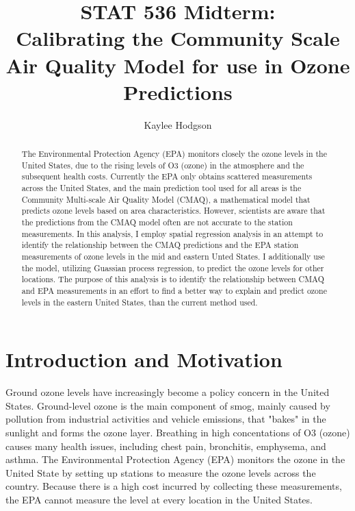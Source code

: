 \documentclass{svproc}
\begin{document}
\mainmatter              
\title{STAT 536 Midterm: \\ Calibrating the Community Scale Air Quality Model for use in Ozone Predictions}
%
\author{Kaylee Hodgson}
%

\maketitle

\begin{abstract}
The Environmental Protection Agency (EPA) monitors closely the ozone levels in the United States, due to the rising levels of O3 (ozone) in the atmosphere and the subsequent health costs. Currently the EPA only obtains scattered measurements across the United States, and the main prediction tool used for all areas is the Community Multi-scale Air Quality Model (CMAQ), a mathematical model that predicts ozone levels based on area characteristics. However, scientists are aware that the predictions from the CMAQ model often are not accurate to the station measurements. In this analysis, I employ spatial regression analysis in an attempt to identify the relationship between the CMAQ predictions and the EPA station measurements of ozone levels in the mid and eastern Unted States. I additionally use the model, utilizing Guassian process regression, to predict the ozone levels for other locations. The purpose of this analysis is to identify the relationship between CMAQ and EPA measurements in an effort to find a better way to explain and predict ozone levels in the eastern United States, than the current method used.
\end{abstract}

\section{Introduction and Motivation}

Ground ozone levels have increasingly become a policy concern in the United States. Ground-level ozone is the main component of smog, mainly caused by pollution from industrial activities and vehicle emissions, that "bakes" in the sunlight and forms the ozone layer. Breathing in high concentations of O3 (ozone) causes many health issues, including chest pain, bronchitis, emphysema, and asthma. The Environmental Protection Agency (EPA) monitors the ozone in the United State by setting up stations to measure the ozone levels across the country. Because there is a high cost incurred by collecting these measurements, the EPA cannot measure the level at every location in the United States.
\end{document}
